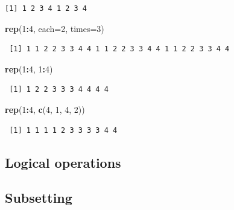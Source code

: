 \documentclass[]{book}
\newenvironment{Shaded}{\begin{snugshade}}{\end{snugshade}}
\newcommand{\DataTypeTok}[1]{\textcolor[rgb]{0.13,0.29,0.53}{#1}}
\newcommand{\DecValTok}[1]{\textcolor[rgb]{0.00,0.00,0.81}{#1}}
\newcommand{\KeywordTok}[1]{\textcolor[rgb]{0.13,0.29,0.53}{\textbf{#1}}}
\newcommand{\NormalTok}[1]{#1}
\newcommand{\OperatorTok}[1]{\textcolor[rgb]{0.81,0.36,0.00}{\textbf{#1}}}
\begin{document}
\begin{verbatim}
[1] 1 2 3 4 1 2 3 4
\end{verbatim}

\begin{Shaded}
\begin{Highlighting}[]
\KeywordTok{rep}\NormalTok{(}\DecValTok{1}\OperatorTok{:}\DecValTok{4}\NormalTok{, }\DataTypeTok{each=}\DecValTok{2}\NormalTok{, }\DataTypeTok{times=}\DecValTok{3}\NormalTok{)}
\end{Highlighting}
\end{Shaded}

\begin{verbatim}
 [1] 1 1 2 2 3 3 4 4 1 1 2 2 3 3 4 4 1 1 2 2 3 3 4 4
\end{verbatim}

\begin{Shaded}
\begin{Highlighting}[]
\KeywordTok{rep}\NormalTok{(}\DecValTok{1}\OperatorTok{:}\DecValTok{4}\NormalTok{, }\DecValTok{1}\OperatorTok{:}\DecValTok{4}\NormalTok{)}
\end{Highlighting}
\end{Shaded}

\begin{verbatim}
 [1] 1 2 2 3 3 3 4 4 4 4
\end{verbatim}

\begin{Shaded}
\begin{Highlighting}[]
\KeywordTok{rep}\NormalTok{(}\DecValTok{1}\OperatorTok{:}\DecValTok{4}\NormalTok{, }\KeywordTok{c}\NormalTok{(}\DecValTok{4}\NormalTok{, }\DecValTok{1}\NormalTok{, }\DecValTok{4}\NormalTok{, }\DecValTok{2}\NormalTok{))}
\end{Highlighting}
\end{Shaded}

\begin{verbatim}
 [1] 1 1 1 1 2 3 3 3 3 4 4
\end{verbatim}

\hypertarget{logical-operations}{%
\subsection{Logical operations}\label{logical-operations}}

\hypertarget{subsetting}{%
\subsection{Subsetting}\label{subsetting}}
\end{document}
